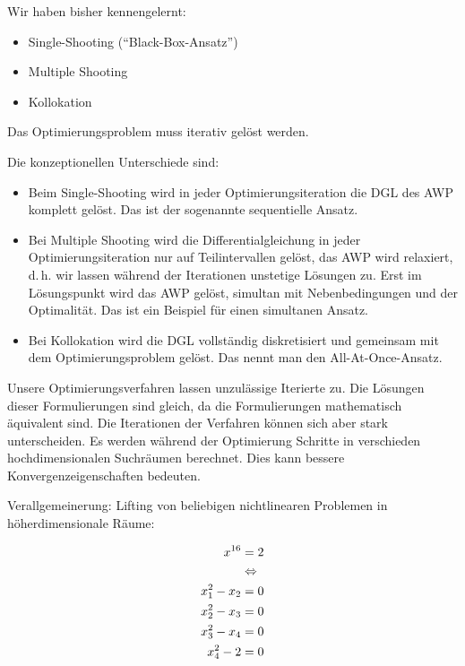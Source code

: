 

Wir haben bisher kennengelernt:

\begin{itemize}
\item Single-Shooting ("`Black-Box-Ansatz"')
\item Multiple Shooting 
\item Kollokation
\end{itemize}

Das Optimierungsproblem muss iterativ gelöst werden.

Die konzeptionellen Unterschiede sind:

\begin{itemize}
\item Beim Single-Shooting wird in jeder Optimierungsiteration die DGL des AWP komplett gelöst. Das ist der sogenannte sequentielle Ansatz.
\item Bei Multiple Shooting wird die Differentialgleichung in jeder Optimierungsiteration nur auf Teilintervallen gelöst, das AWP wird relaxiert, d.\,h. wir lassen während der Iterationen unstetige Lösungen zu. Erst im Lösungspunkt wird das AWP gelöst, simultan mit Nebenbedingungen und der Optimalität. Das ist ein Beispiel für einen simultanen Ansatz.
\item Bei Kollokation wird die DGL vollständig diskretisiert und gemeinsam mit dem Optimierungsproblem gelöst. Das nennt man den All-At-Once-Ansatz.
\end{itemize}

Unsere Optimierungsverfahren lassen unzulässige Iterierte zu. Die Lösungen dieser Formulierungen sind gleich, da die Formulierungen mathematisch äquivalent sind. Die Iterationen der Verfahren können sich aber stark unterscheiden. Es werden während der Optimierung Schritte in verschieden hochdimensionalen Suchräumen berechnet. Dies kann bessere Konvergenzeigenschaften bedeuten.

Verallgemeinerung: Lifting von beliebigen nichtlinearen Problemen in höherdimensionale Räume:

\begin{align*}
x^{16} &= 2 \\
&\Leftrightarrow \\
x_1^2 - x_2 &= 0 \\
x_2^2 - x_3 &= 0 \\
x_3^2 - x_4 &= 0 \\
x_4^2 -  2  &= 0 \\
\end{align*}

